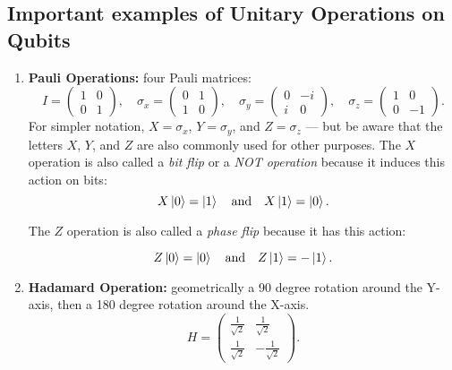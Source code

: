 \documentclass[11pt]{scrartcl}
\begin{document}
\subsection{Important examples of Unitary Operations on Qubits}
\begin{enumerate}
	\item \textbf{Pauli Operations:} four Pauli matrices:
	\[
	I=
	\begin{pmatrix}
	1 & 0 \\
	0 & 1
	\end{pmatrix}, \quad
	\sigma_x =
	\begin{pmatrix}
	0 & 1 \\
	1 & 0
	\end{pmatrix}, \quad
	\sigma_y =
	\begin{pmatrix}
	0 & -i \\
	i & 0
	\end{pmatrix}, \quad
	\sigma_z =
	\begin{pmatrix}
	1 & 0 \\
	0 & -1
	\end{pmatrix}.
	\]
	For simpler notation, \( X = \sigma_x \), \( Y = \sigma_y \), and \( Z = \sigma_z \) — but be aware that the letters \( X \), \( Y \), and \( Z \) are also commonly used for other purposes. The \( X \) operation is also called a \textit{bit flip} or a \textit{NOT operation} because it induces this action on bits:
	\[
	X\ket{0} = \ket{1} \quad \text{and} \quad X\ket{1} = \ket{0}.
	\]

	The \( Z \) operation is also called a \textit{phase flip} because it has this action:

	\[
	Z\ket{0} = \ket{0} \quad \text{and} \quad Z\ket{1} = -\ket{1}.
	\]
	\item \textbf{Hadamard Operation:} geometrically a 90 degree rotation around the Y-axis, then a 180 degree rotation around the X-axis.
	\[
	H = \begin{pmatrix}
	\frac{1}{\sqrt{2}} & \frac{1}{\sqrt{2}} \\
	\frac{1}{\sqrt{2}} & -\frac{1}{\sqrt{2}}
	\end{pmatrix}.
	\]
\end{enumerate}
\end{document}
